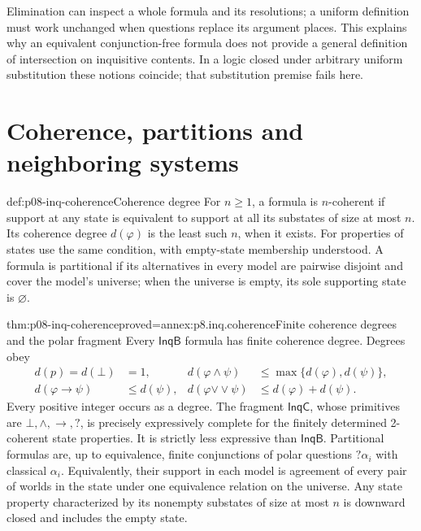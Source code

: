 Elimination can inspect a whole formula and its resolutions; a uniform
definition must work unchanged when questions replace its argument places.
This explains why an equivalent conjunction-free formula does not provide
a general definition of intersection on inquisitive contents. In a logic
closed under arbitrary uniform substitution these notions coincide; that
substitution premise fails here.

\section{Coherence, partitions and neighboring systems}

\begin{hbdefinition}{def:p08-inq-coherence}{Coherence degree}
For \(n\geq1\), a formula is \(n\)-coherent if support at any state is
equivalent to support at all its substates of size at most \(n\).
Its coherence degree \(d(\varphi)\) is the least such \(n\), when it exists.
For properties of states use the same condition, with empty-state membership
understood. A formula is partitional if its alternatives in every model
are pairwise disjoint and cover the model's universe; when the universe
is empty, its sole supporting state is \(\varnothing\).
\end{hbdefinition}

\begin{hbtheorem}{thm:p08-inq-coherence}{proved=annex:p8.inq.coherence}{Finite coherence degrees and the polar fragment}
Every \(\mathsf{InqB}\) formula has finite coherence degree. Degrees obey
\[
\begin{aligned}
 d(p)=d(\bot)&=1,&
 d(\varphi\land\psi)&\leq\max\{d(\varphi),d(\psi)\},\\
 d(\varphi\to\psi)&\leq d(\psi),&
 d(\varphi\mathbin{\vee\!\vee}\psi)&\leq d(\varphi)+d(\psi).
\end{aligned}
\]
Every positive integer occurs as a degree. The fragment
\(\mathsf{InqC}\), whose primitives are \(\bot,\land,\to,?\), is precisely
expressively complete for the finitely determined 2-coherent state properties.
It is strictly less expressive than \(\mathsf{InqB}\).
Partitional formulas are, up to equivalence, finite conjunctions of polar
questions \(?\alpha_i\) with classical \(\alpha_i\).
Equivalently, their support in each model is agreement of every pair of
worlds in the state under one equivalence relation on the universe.
Any state property characterized by its nonempty substates of size at
most \(n\) is downward closed and includes the empty state.
\end{hbtheorem}

